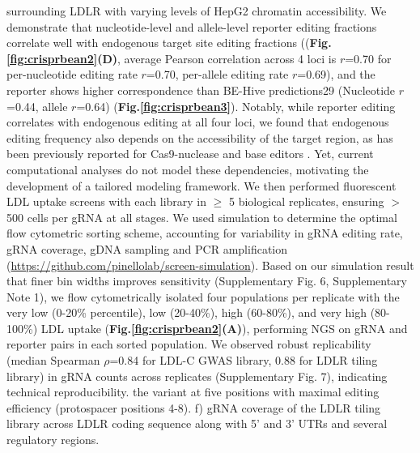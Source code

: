 \documentclass[a4paper, titlepage, openright]{book}
\begin{document}
surrounding LDLR with varying levels of HepG2 chromatin accessibility. We demonstrate that nucleotide-level and allele-level reporter editing fractions correlate well with endogenous target site editing fractions ((\textbf{Fig.\ref{fig:crisprbean2}(D)}, average Pearson correlation across 4 loci is $r$=0.70 for per-nucleotide editing rate $r$=0.70, per-allele editing rate $r$=0.69), and the reporter shows higher correspondence than BE-Hive predictions29 (Nucleotide $r$=0.44, allele $r$=0.64) (\textbf{Fig.\ref{fig:crisprbean3}}). Notably, while reporter editing correlates with endogenous editing at all four loci, we found that endogenous editing frequency also depends on the accessibility of the target region, as has been previously reported for Cas9-nuclease \citep{schep2021impact, ding2019improving, liu2019modulating} and base editors \citep{shin2021small, yang2023hmgn1}. Yet, current computational analyses do not model these dependencies, motivating the development of a tailored modeling framework.
We then performed fluorescent LDL uptake screens with each library in $\geq$ 5 biological replicates, ensuring $>$500 cells per gRNA at all stages. We used simulation to determine the optimal flow cytometric sorting scheme, accounting for variability in gRNA editing rate, gRNA coverage, gDNA sampling and PCR amplification (\url{https://github.com/pinellolab/screen-simulation}). Based on our simulation result that finer bin widths improves sensitivity (Supplementary Fig. 6, Supplementary Note 1), we flow cytometrically isolated four populations per replicate with the very low (0-20\% percentile), low (20-40\%), high (60-80\%), and very high (80-100\%) LDL uptake (\textbf{Fig.\ref{fig:crisprbean2}(A)}), performing NGS on gRNA and reporter pairs in each sorted population. We observed robust replicability (median Spearman $\rho$=0.84 for LDL-C GWAS library, 0.88 for LDLR tiling library) in gRNA counts across replicates (Supplementary Fig. 7), indicating technical reproducibility.  the variant at five positions with maximal editing efficiency (protospacer positions 4-8). f) gRNA coverage of the LDLR tiling library across LDLR coding sequence along with 5’ and 3’ UTRs and several regulatory regions. 
\end{document}
